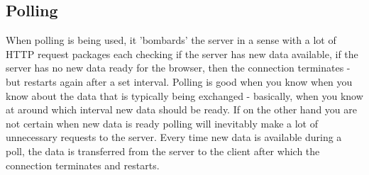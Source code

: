 \subsection{Polling}


When polling is being used, it 'bombards' the server in a sense with a lot of HTTP request packages each checking if the server has new data available, if the server has no new data ready for the browser, then the connection terminates - but restarts again after a set interval\cite{lubbersgreco}. Polling is good when you know when you know about the data that is typically being exchanged\cite{lubbersgreco} - basically, when you know at around which interval new data should be ready. If on the other hand you are not certain when new data is ready polling will inevitably make a lot of unnecessary requests to the server\cite{lubbersgreco}. Every time new data is available during a poll, the data is transferred from the server to the client after which the connection terminates and restarts\cite{lubbersgreco}.